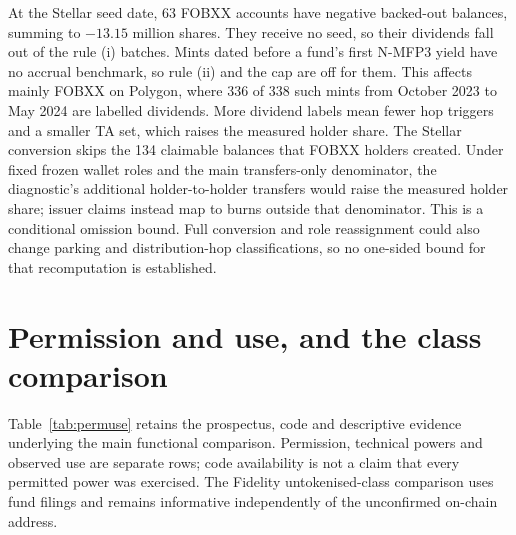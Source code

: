 \documentclass[12pt,a4paper]{article}
\makeatletter
\renewcommand\paragraph{\@startsection{paragraph}{4}{\z@}{3.25ex \@plus1ex \@minus.2ex}{-0.4em}{\normalfont\normalsize\bfseries}}
\makeatother
\begin{document}
\paragraph{Data-quality notes:} At the Stellar seed date, 63 FOBXX accounts have negative backed-out balances, summing to $-13.15$ million shares.
They receive no seed, so their dividends fall out of the rule (i) batches. Mints dated before a fund's first \mbox{N-MFP3} yield have no accrual benchmark, so rule (ii) and the cap are off for them. This affects mainly FOBXX on Polygon, where 336 of 338 such mints from October 2023 to May 2024 are labelled dividends.
More dividend labels mean fewer hop triggers and a smaller TA set, which raises the measured holder share. The Stellar conversion skips the 134 claimable balances that FOBXX holders created.
Under fixed frozen wallet roles and the main transfers-only denominator, the diagnostic's additional holder-to-holder transfers would raise the measured holder share; issuer claims instead map to burns outside that denominator. This is a conditional omission bound. Full conversion and role reassignment could also change parking and distribution-hop classifications, so no one-sided bound for that recomputation is established.

\section{Permission and use, and the class comparison}\label{app:permissions}
Table~\ref{tab:permuse} retains the prospectus, code and descriptive evidence underlying the main functional comparison. Permission, technical powers and observed use are separate rows; code availability is not a claim that every permitted power was exercised. The Fidelity untokenised-class comparison uses fund filings and remains informative independently of the unconfirmed on-chain address.
\end{document}
